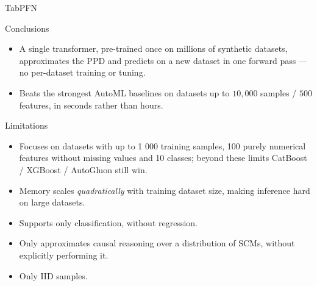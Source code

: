 \begin{frame}{TabPFN}
  \footnotesize
  \begin{block}{Conclusions}
    \begin{itemize}[<+->]
      \item A single transformer, pre-trained once on millions of synthetic datasets,
            approximates the PPD and predicts on a new dataset in one forward pass
            --- no per-dataset training or tuning.
      \item Beats the strongest AutoML baselines on datasets up to
            $10{,}000$ samples / $500$ features, in seconds rather than hours.
    \end{itemize}
  \end{block}
  \begin{alertblock}{Limitations}
    \begin{itemize}[<+->]
      \item Focuses on datasets with up to 1 000 training samples, 100 purely numerical
            features without missing values and 10 classes; beyond these limits
            CatBoost / XGBoost / AutoGluon still win.
      \item Memory scales \emph{quadratically} with training dataset size, making inference
            hard on large datasets.
      \item Supports only classification, without regression.
      \item Only approximates causal reasoning over a distribution of SCMs,
            without explicitly performing it.
      \item Only IID samples.
    \end{itemize}
  \end{alertblock}
\end{frame}
